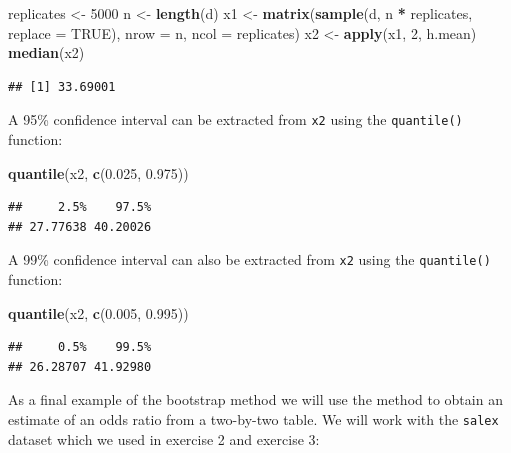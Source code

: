 \documentclass[12pt,a4paper]{book}
\newenvironment{Shaded}{\begin{snugshade}}{\end{snugshade}}
\newcommand{\KeywordTok}[1]{\textcolor[rgb]{0.13,0.29,0.53}{\textbf{#1}}}
\newcommand{\DataTypeTok}[1]{\textcolor[rgb]{0.13,0.29,0.53}{#1}}
\newcommand{\DecValTok}[1]{\textcolor[rgb]{0.00,0.00,0.81}{#1}}
\newcommand{\FloatTok}[1]{\textcolor[rgb]{0.00,0.00,0.81}{#1}}
\newcommand{\StringTok}[1]{\textcolor[rgb]{0.31,0.60,0.02}{#1}}
\newcommand{\OtherTok}[1]{\textcolor[rgb]{0.56,0.35,0.01}{#1}}
\newcommand{\OperatorTok}[1]{\textcolor[rgb]{0.81,0.36,0.00}{\textbf{#1}}}
\newcommand{\NormalTok}[1]{#1}
\theoremstyle{definition}
\theoremstyle{definition}
\theoremstyle{definition}
\theoremstyle{remark}
\begin{document}
\begin{Shaded}
\begin{Highlighting}[]
\NormalTok{replicates <-}\StringTok{ }\DecValTok{5000}
\NormalTok{n <-}\StringTok{ }\KeywordTok{length}\NormalTok{(d)}
\NormalTok{x1 <-}\StringTok{ }\KeywordTok{matrix}\NormalTok{(}\KeywordTok{sample}\NormalTok{(d, n }\OperatorTok{*}\StringTok{ }\NormalTok{replicates, }\DataTypeTok{replace =} \OtherTok{TRUE}\NormalTok{),}
             \DataTypeTok{nrow =}\NormalTok{ n, }\DataTypeTok{ncol =}\NormalTok{ replicates)}
\NormalTok{x2 <-}\StringTok{ }\KeywordTok{apply}\NormalTok{(x1, }\DecValTok{2}\NormalTok{, h.mean)}
\KeywordTok{median}\NormalTok{(x2)}
\end{Highlighting}
\end{Shaded}

\begin{verbatim}
## [1] 33.69001
\end{verbatim}

A 95\% confidence interval can be extracted from \texttt{x2} using the
\texttt{quantile()} function:

\begin{Shaded}
\begin{Highlighting}[]
\KeywordTok{quantile}\NormalTok{(x2, }\KeywordTok{c}\NormalTok{(}\FloatTok{0.025}\NormalTok{, }\FloatTok{0.975}\NormalTok{))}
\end{Highlighting}
\end{Shaded}

\begin{verbatim}
##     2.5%    97.5% 
## 27.77638 40.20026
\end{verbatim}

A 99\% confidence interval can also be extracted from \texttt{x2} using
the \texttt{quantile()} function:

\begin{Shaded}
\begin{Highlighting}[]
\KeywordTok{quantile}\NormalTok{(x2, }\KeywordTok{c}\NormalTok{(}\FloatTok{0.005}\NormalTok{, }\FloatTok{0.995}\NormalTok{))}
\end{Highlighting}
\end{Shaded}

\begin{verbatim}
##     0.5%    99.5% 
## 26.28707 41.92980
\end{verbatim}

As a final example of the bootstrap method we will use the method to
obtain an estimate of an odds ratio from a two-by-two table. We will
work with the \texttt{salex} dataset which we used in exercise 2 and
exercise 3:
\end{document}
